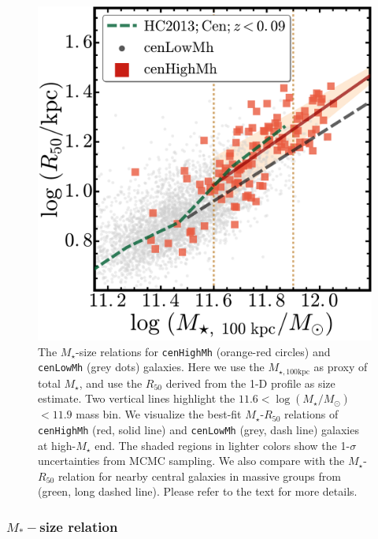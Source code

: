 \documentclass{emulateapj}
\def\rbcg{\texttt{cenHighMh}}
\def\nbcg{\texttt{cenLowMh}}
\def\mstar{{$M_{\star}$}}
\def\logms{{$\log (M_{\star}/M_{\odot})$}}
\def\mtot{{$M_{\star,100\mathrm{kpc}}$}}
\begin{document}
\begin{CJK*}{UTF8}{gbsn}
  \begin{figure}[bt!]
      \centering 
      \includegraphics[width=\columnwidth]{fig/redbcg_mass_r50}
      \caption{The \mstar{}-size relations for \rbcg{} (orange-red circles) and \nbcg{} 
          (grey dots) galaxies. 
          Here we use the \mtot{} as proxy of total \mstar{}, and use the 
          $R_{\mathrm{50}}$ derived from the 1-D profile as size estimate. 
          Two vertical lines highlight the $11.6<$\logms{}$<11.9$ mass bin.
          We visualize the best-fit \mstar{}-$R_{\mathrm{50}}$ relations of \rbcg{} 
          (red, solid line) and \nbcg{} (grey, dash line) galaxies at high-\mstar{} end.
          The shaded regions in lighter colors show the 1-$\sigma$ uncertainties
          from MCMC sampling. 
          We also compare with the \mstar{}-$R_{\mathrm{50}}$ relation for nearby central 
          galaxies in massive groups from \citet{HCompany13} (green, long dashed line). 
          Please refer to the text for more details.}
      \label{fig:mass_r50}
  \end{figure}

\subsubsection{$M_{\ast}-$size relation}
    \label{sssec:mass_size}
        

\end{CJK*}
\end{document}
